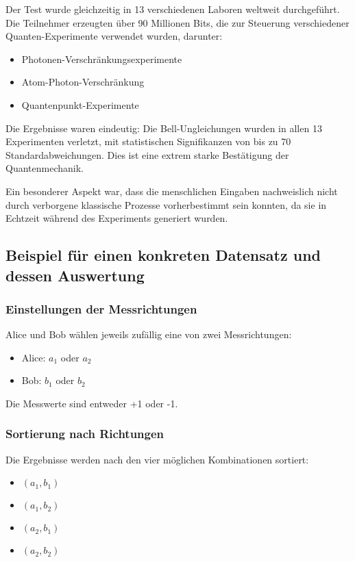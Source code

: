 \documentclass[12pt,a4paper]{article}
\begin{document}
	Der Test wurde gleichzeitig in 13 verschiedenen Laboren weltweit durchgeführt. Die Teilnehmer erzeugten über 90 Millionen Bits, die zur Steuerung verschiedener Quanten-Experimente verwendet wurden, darunter:
	\begin{itemize}
		\item Photonen-Verschränkungsexperimente
		\item Atom-Photon-Verschränkung
		\item Quantenpunkt-Experimente
	\end{itemize}
	
	Die Ergebnisse waren eindeutig: Die Bell-Ungleichungen wurden in allen 13 Experimenten verletzt, mit statistischen Signifikanzen von bis zu 70 Standardabweichungen. Dies ist eine extrem starke Bestätigung der Quantenmechanik.
	
	Ein besonderer Aspekt war, dass die menschlichen Eingaben nachweislich nicht durch verborgene klassische Prozesse vorherbestimmt sein konnten, da sie in Echtzeit während des Experiments generiert wurden.
	
	\subsection{Beispiel für einen konkreten Datensatz und dessen Auswertung}
	
	\subsubsection{Einstellungen der Messrichtungen}
	Alice und Bob wählen jeweils zufällig eine von zwei Messrichtungen:
	\begin{itemize}
		\item Alice: \(a_1\) oder \(a_2\)
		\item Bob: \(b_1\) oder \(b_2\)
	\end{itemize}
	Die Messwerte sind entweder +1 oder -1.
	
	
	
	
	\subsubsection{Sortierung nach Richtungen}
	Die Ergebnisse werden nach den vier möglichen Kombinationen sortiert:
	\begin{itemize}
		\item \((a_1, b_1)\)
		\item \((a_1, b_2)\)
		\item \((a_2, b_1)\)
		\item \((a_2, b_2)\)
	\end{itemize}
	
\end{document}
